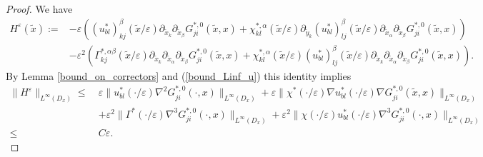 \documentclass[11pt, reqno]{amsart}
\theoremstyle{definition}
\theoremstyle{remark}
\numberwithin{equation}{section}
\begin{document}
	\begin{proof}[Proof] We have
		\begin{align*}
			H^{\varepsilon}(\tilde{x}):=	&-\varepsilon \left((u^*_{bl})^{\beta}_{kj}	(\tilde{x}/\varepsilon)\partial_{\tilde{x}_k}\partial_{\tilde{x}_{\beta}} G_{ji}^{*,0}  (\tilde{x},x)+  \chi^{*,\alpha}_{kl}(\tilde{x}/\varepsilon)\partial_{\tilde{y}_k}(u^*_{bl})^{\beta}_{lj}	(\tilde{x}/\varepsilon)\partial_{\tilde{x} _{\alpha}}\partial_{\tilde{x}_{\beta}} G_{ji}^{*,0}  (\tilde{x},x) \right)\nonumber  \\
			& - \varepsilon^2 \left(  \Gamma^{*,\alpha\beta}_{kj}(\tilde{x}/\varepsilon)\partial_{\tilde{x}_k}\partial_{\tilde{x} _{\alpha}}\partial_{\tilde{x}_{\beta}} G_{ji}^{*,0}  (\tilde{x},x) + 	\chi^{*,\alpha}_{kl}(\tilde{x}/\varepsilon)(u^*_{bl})^{\beta}_{lj}		(\tilde{x}/\varepsilon)\partial_{\tilde{x}_k}\partial_{\tilde{x} _{\alpha}}\partial_{\tilde{x}_{\beta}} G_{ji}^{*,0}  (\tilde{x},x) \right).
		\end{align*}	
	By  Lemma \ref{bound_on_correctors} 	and (\ref{bound_Linf_u}) this identity implies
		\begin{align*}
			\| H^\varepsilon \|_{L^\infty(D_x)}   \leq \: & \varepsilon  \| u_{bl}^{*}(\cdot /\varepsilon)\nabla^2 G_{ji}^{*,0}  (\cdot,x) \|_{L^\infty(D_x)} +   \varepsilon \| \chi^{*}(\cdot/\varepsilon)\nabla u_{bl}^{*}	(\cdot/\varepsilon)\nabla G_{ji}^{*,0}  (\tilde{x},x) \|_{L^\infty(D_x)}\\
			& +  \varepsilon^2 \|\Gamma^*(\cdot/\varepsilon) \nabla^3 G_{ji}^{*,0}  (\cdot,x) \|_{L^\infty(D_x)} + \varepsilon^2 \|\chi(\cdot/\varepsilon)u_{bl}^*(\cdot/\varepsilon) \nabla^3 G_{ji}^{*,0} (\cdot,x) \|_{L^\infty(D_x)} \\
			\leq \: & C\varepsilon.
		\end{align*}
		

\end{proof}
\end{document}
